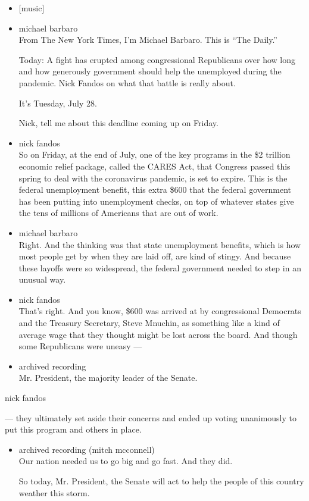 \begin{itemize}
\item
  {[}music{]}
\item
  michael barbaro\\
  From The New York Times, I'm Michael Barbaro. This is ``The Daily.''

  Today: A fight has erupted among congressional Republicans over how
  long and how generously government should help the unemployed during
  the pandemic. Nick Fandos on what that battle is really about.

  It's Tuesday, July 28.

  Nick, tell me about this deadline coming up on Friday.
\item
  nick fandos\\
  So on Friday, at the end of July, one of the key programs in the \$2
  trillion economic relief package, called the CARES Act, that Congress
  passed this spring to deal with the coronavirus pandemic, is set to
  expire. This is the federal unemployment benefit, this extra \$600
  that the federal government has been putting into unemployment checks,
  on top of whatever states give the tens of millions of Americans that
  are out of work.
\item
  michael barbaro\\
  Right. And the thinking was that state unemployment benefits, which is
  how most people get by when they are laid off, are kind of stingy. And
  because these layoffs were so widespread, the federal government
  needed to step in an unusual way.
\item
  nick fandos\\
  That's right. And you know, \$600 was arrived at by congressional
  Democrats and the Treasury Secretary, Steve Mnuchin, as something like
  a kind of average wage that they thought might be lost across the
  board. And though some Republicans were uneasy ---
\item
  archived recording\\
  Mr. President, the majority leader of the Senate.
\end{itemize}

nick fandos

--- they ultimately set aside their concerns and ended up voting
unanimously to put this program and others in place.

\begin{itemize}
\item
  archived recording (mitch mcconnell)\\
  Our nation needed us to go big and go fast. And they did.

  So today, Mr. President, the Senate will act to help the people of
  this country weather this storm.
\end{itemize}

